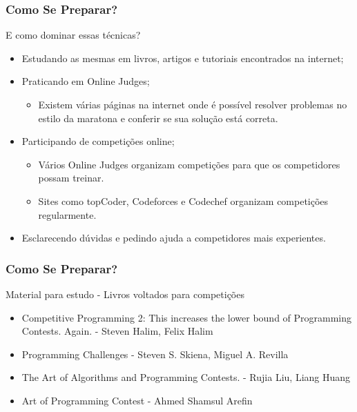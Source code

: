 \begin{frame}
\frametitle{Como Se Preparar?}
\begin{block}{E como dominar essas técnicas?}
\begin{itemize}	
	\item Estudando as mesmas em livros, artigos e tutoriais encontrados na internet;
	\item Praticando em Online Judges;
	\begin{itemize}
		\item Existem várias páginas na internet onde é possível resolver problemas no estilo da maratona e conferir se sua solução está correta.
	\end{itemize}
	\item Participando de competições online;
	\begin{itemize}
		\item Vários Online Judges organizam competições para que os competidores possam treinar.
		\item Sites como topCoder, Codeforces e Codechef organizam competições regularmente.
	\end{itemize}
	\item Esclarecendo dúvidas e pedindo ajuda a competidores mais experientes.
\end{itemize}
\end{block}
\end{frame}

\begin{frame}
\frametitle{Como Se Preparar?}
\begin{block}{Material para estudo - Livros voltados	 para competições}
\begin{itemize}
		\item Competitive Programming 2: This increases the lower bound of Programming Contests. Again. - Steven Halim, Felix Halim
		\item Programming Challenges - Steven S. Skiena, Miguel A. Revilla 
		\item The Art of Algorithms and Programming Contests. - Rujia Liu, Liang Huang 
		\item Art of Programming Contest - Ahmed Shamsul Arefin
\end{itemize}
\end{block}
\end{frame}

